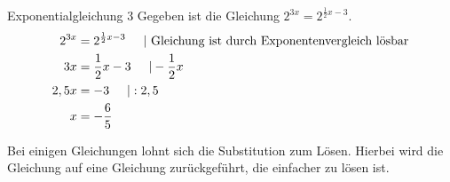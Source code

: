 \begin{bsp}{Exponentialgleichung 3}{}
Gegeben ist die Gleichung $2^{3x} =2^{\frac{1}{2}x-3}$.
\begin{equation*}
    \begin{split}
    2^{3x} &=2^{\frac{1}{2}x-3} \hspace{0.5cm}| \text{ Gleichung ist durch Exponentenvergleich lösbar}\\
    3x&= \frac{1}{2}x-3  \hspace{0.5cm}| - \frac{1}{2}x\\
    2,5x &=-3 \hspace{0.5cm}|:2,5\\
    x&= -\dfrac{6}{5}
    \end{split}
\end{equation*}
\end{bsp}
Bei einigen Gleichungen lohnt sich die Substitution zum Lösen. Hierbei wird die Gleichung auf eine Gleichung zurückgeführt, die einfacher zu lösen ist.

